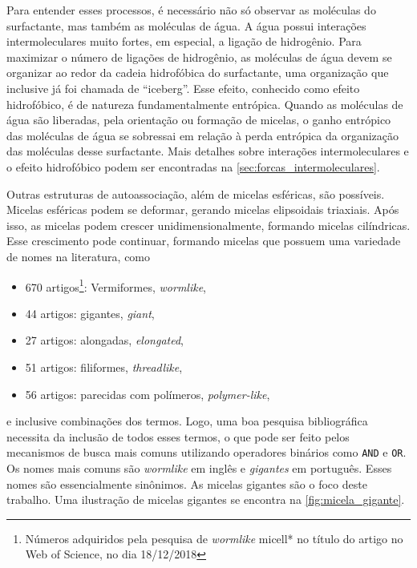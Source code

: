 	Para entender esses processos, é necessário não só observar as moléculas do surfactante, mas também as moléculas de água. A água possui interações intermoleculares muito fortes, em especial, a ligação de hidrogênio. Para maximizar o número de ligações de hidrogênio, as moléculas de água devem se organizar ao redor da cadeia hidrofóbica do surfactante, uma organização que inclusive já foi chamada de ``iceberg''\cite{FrankEvans1945}. Esse efeito, conhecido como efeito hidrofóbico\cite{Tanford1978}, é de natureza fundamentalmente entrópica. Quando as moléculas de água são liberadas, pela orientação ou formação de micelas, o ganho entrópico das moléculas de água se sobressai em relação à perda entrópica da organização das moléculas desse surfactante. Mais detalhes sobre interações intermoleculares e o efeito hidrofóbico podem ser encontradas na \autoref{sec:forcas_intermoleculares}.

	Outras estruturas de autoassociação, além de micelas esféricas, são possíveis.\cite{Lindman_livro} Micelas esféricas podem se deformar, gerando micelas elipsoidais triaxiais.\cite{Alves2017} Após isso, as micelas podem crescer unidimensionalmente, formando micelas cilíndricas. Esse crescimento pode continuar, formando micelas que possuem uma variedade de nomes na literatura, como 
	
	\begin{itemize}[noitemsep]
		\item 670 artigos\footnote{Números adquiridos pela pesquisa de \emph{wormlike} micell* no título do artigo no Web of Science, no dia 18/12/2018}: Vermiformes, \emph{wormlike}\cite{Calabrese2018, Chu2010b, Ito2016, Lin2010a, Dreiss2007},
		\item 44 artigos: gigantes, \emph{giant}\cite{Giant_Micelles, Cates2006, Messager1988a},
		\item 27 artigos: alongadas, \emph{elongated}\cite{Shikata1987, Porte1980a, Oda1999a, Makhloufi1989},
		\item 51 artigos: filiformes, \emph{threadlike}\cite{Danino1995a, Shi2014, Imai2001a,Brown1989a},
		\item 56 artigos: parecidas com polímeros, \emph{polymer-like}\cite{Appel1990, BaldelliBombelli2002a, Garamus2000},
	\end{itemize}
	
	\noindent e inclusive combinações dos termos\cite{Won1999, Georgieva2016}. Logo, uma boa pesquisa bibliográfica necessita da inclusão de todos esses termos, o que pode ser feito pelos mecanismos de busca mais comuns utilizando operadores binários como \texttt{AND} e \texttt{OR}. Os nomes mais comuns são \emph{wormlike} em inglês e \emph{gigantes} em português. Esses nomes são essencialmente sinônimos. As micelas gigantes são o foco deste trabalho. Uma ilustração de micelas gigantes se encontra na \autoref{fig:micela_gigante}. 
		
